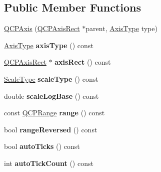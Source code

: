 \subsection*{Public Member Functions}
\begin{DoxyCompactItemize}
\item 
\mbox{\hyperlink{class_q_c_p_axis_ac62c042968bae0e6d474fcfc57c9b71f}{Q\+C\+P\+Axis}} (\mbox{\hyperlink{class_q_c_p_axis_rect}{Q\+C\+P\+Axis\+Rect}} $\ast$parent, \mbox{\hyperlink{class_q_c_p_axis_ae2bcc1728b382f10f064612b368bc18a}{Axis\+Type}} type)
\item 
\mbox{\label{class_q_c_p_axis_aa19679359783c5ecd27757b7e5619976}} 
\mbox{\hyperlink{class_q_c_p_axis_ae2bcc1728b382f10f064612b368bc18a}{Axis\+Type}} {\bfseries axis\+Type} () const
\item 
\mbox{\label{class_q_c_p_axis_afc94bcfdf8adfe8e01013f13bdf159a2}} 
\mbox{\hyperlink{class_q_c_p_axis_rect}{Q\+C\+P\+Axis\+Rect}} $\ast$ {\bfseries axis\+Rect} () const
\item 
\mbox{\label{class_q_c_p_axis_ad23e9ad97b44e9aeaf4fab8904280098}} 
\mbox{\hyperlink{class_q_c_p_axis_a36d8e8658dbaa179bf2aeb973db2d6f0}{Scale\+Type}} {\bfseries scale\+Type} () const
\item 
\mbox{\label{class_q_c_p_axis_a8f1cdf4b2b446db90adc7c1e2a826600}} 
double {\bfseries scale\+Log\+Base} () const
\item 
\mbox{\label{class_q_c_p_axis_ac4058855a81f1a883cf2e754f6a6acb1}} 
const \mbox{\hyperlink{class_q_c_p_range}{Q\+C\+P\+Range}} {\bfseries range} () const
\item 
\mbox{\label{class_q_c_p_axis_ab9866dd1a78f1920f491ec12a794bec2}} 
bool {\bfseries range\+Reversed} () const
\item 
\mbox{\label{class_q_c_p_axis_a2e377eff6e7f6529cc672901971721bd}} 
bool {\bfseries auto\+Ticks} () const
\item 
\mbox{\label{class_q_c_p_axis_a3fe8fce237b74f4dc46154048b7187e7}} 
int {\bfseries auto\+Tick\+Count} () const
\item 

\end{DoxyCompactItemize}
